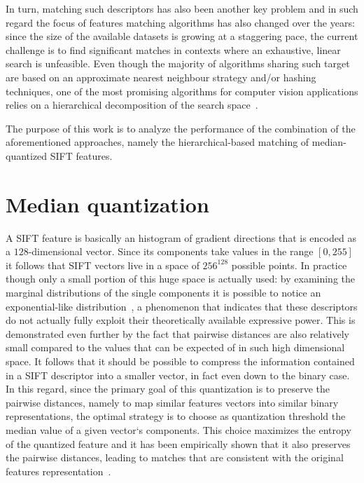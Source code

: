 \documentclass[a4paper, 11pt, oneside]{article}
\begin{document}
  
  In turn, matching such descriptors has also been another key problem and in such regard the focus of features matching algorithms has also changed over the years: since the size of the available datasets is growing at a staggering pace, the current challenge is to find significant matches in contexts where an exhaustive, linear search is unfeasible. Even though the majority of algorithms sharing such target are based on an approximate nearest neighbour strategy and/or hashing techniques, one of the most promising algorithms for computer vision applications relies on a hierarchical decomposition of the search space~\cite{muja2012fast}.
  
  
  The purpose of this work is to analyze the performance of the combination of the aforementioned approaches, namely the hierarchical-based matching of median-quantized SIFT features.
  \section*{Median quantization}
  A SIFT feature is basically an histogram of gradient directions that is encoded as a $128$-dimensional vector. Since its components take values in the range $[0, 255]$ it follows that SIFT vectors live in a space of $256^{128}$ possible points. In practice though only a small portion of this huge space is actually used: by examining the marginal distributions of the single components it is possible to notice an exponential-like distribution~\cite{peker2011binary}, a phenomenon that indicates that these descriptors do not actually fully exploit their theoretically available expressive power. This is demonstrated even further by the fact that pairwise distances are also relatively small compared to the values that can be expected of in such high dimensional space. It follows that it should be possible to compress the information contained in a SIFT descriptor into a smaller vector, in fact even down to the binary case. In this regard, since the primary goal of this quantization is to preserve the pairwise distances, namely to map similar features vectors into similar binary representations, the optimal strategy is to choose as quantization threshold the median value of a given vector`s components. This choice maximizes the entropy of the quantized feature and it has been empirically shown that it also preserves the pairwise distances, leading to matches that are consistent with the original features representation~\cite{peker2011binary}.
  
  
\end{document}
